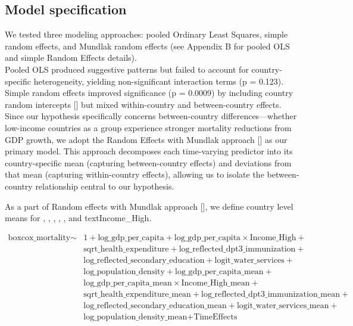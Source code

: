 \documentclass[10pt,a4paper]{article}
\begin{document}
\subsection{Model specification}

We tested three modeling approaches: pooled Ordinary Least Squares, simple random effects, and Mundlak random effects (see Appendix B for pooled OLS and simple Random Effects details). \\Pooled OLS produced suggestive patterns but failed to account for country-specific heterogeneity, yielding non-significant interaction terms (p = 0.123). \\Simple random effects improved significance (p = 0.0009) by including country random intercepts [\cite{gelman2007,fitzmaurice2011}] but mixed within-country and between-country effects. \\Since our hypothesis specifically concerns between-country differences—whether low-income countries as a group experience stronger mortality reductions from GDP growth, we adopt the Random Effects with Mundlak approach [\cite{wooldridge2021}] as our primary model. This approach decomposes each time-varying predictor into its country-specific mean (capturing between-country effects) and deviations from that mean (capturing within-country effects), allowing us to isolate the between-country relationship central to our hypothesis.

As a part of Random effects with Mundlak approach [\cite{wooldridge2021}], we define country level means for , , , ,
,  and text{Income\_High}.

    \begin{equation}
    \begin{split}
    \text{boxcox\_mortality} \sim & 1 + \text{log\_gdp\_per\_capita} + \text{log\_gdp\_per\_capita} \times \text{Income\_High} + \\
    & \text{sqrt\_health\_expenditure} + \text{log\_reflected\_dpt3\_immunization} + \\
    & \text{log\_reflected\_secondary\_education} + \text{logit\_water\_services} + \\
    & \text{log\_population\_density} + \text{log\_gdp\_per\_capita\_mean} + \\
    & \text{log\_gdp\_per\_capita\_mean} \times \text{Income\_High\_mean} + \\
    & \text{sqrt\_health\_expenditure\_mean} + \text{log\_reflected\_dpt3\_immunization\_mean} + \\
    & \text{log\_reflected\_secondary\_education\_mean} + \text{logit\_water\_services\_mean} + \\
    & \text{log\_population\_density\_mean} + \text{TimeEffects}
    \end{split}
    \end{equation}
\end{document}
